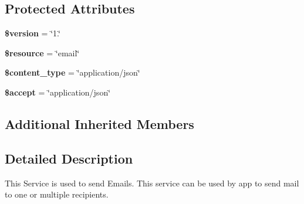 \subsection*{Protected Attributes}
\begin{DoxyCompactItemize}
\item 
\hypertarget{class_email_service_a17c8948c68aa44fa9961ae169b6a8961}{{\bfseries \$version} = \char`\"{}1.\char`\"{}}\label{class_email_service_a17c8948c68aa44fa9961ae169b6a8961}

\item 
\hypertarget{class_email_service_abd4c7b8b084214b8d2533ba07fce6b83}{{\bfseries \$resource} = \char`\"{}email\char`\"{}}\label{class_email_service_abd4c7b8b084214b8d2533ba07fce6b83}

\item 
\hypertarget{class_email_service_ae754d6373f275e781f47c8bc9b994b6d}{{\bfseries \$content\+\_\+type} = \char`\"{}application/json\char`\"{}}\label{class_email_service_ae754d6373f275e781f47c8bc9b994b6d}

\item 
\hypertarget{class_email_service_a75fc18c4ff06288ff9fdf8aba9bd1081}{{\bfseries \$accept} = \char`\"{}application/json\char`\"{}}\label{class_email_service_a75fc18c4ff06288ff9fdf8aba9bd1081}

\end{DoxyCompactItemize}
\subsection*{Additional Inherited Members}


\subsection{Detailed Description}
This Service is used to send Emails. This service can be used by app to send mail to one or multiple recipients. 

